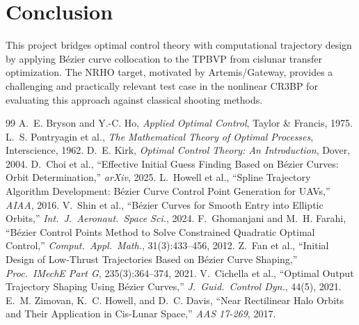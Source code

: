 \documentclass[11pt]{article}
\begin{document}
\section{Conclusion}

This project bridges optimal control theory with computational trajectory design by applying B\'{e}zier curve collocation to the TPBVP from cislunar transfer optimization. The NRHO target, motivated by Artemis/Gateway, provides a challenging and practically relevant test case in the nonlinear CR3BP for evaluating this approach against classical shooting methods.

\begin{thebibliography}{99}
 A.~E. Bryson and Y.-C. Ho, \textit{Applied Optimal Control}, Taylor \& Francis, 1975.
 L.~S. Pontryagin et al., \textit{The Mathematical Theory of Optimal Processes}, Interscience, 1962.
 D.~E. Kirk, \textit{Optimal Control Theory: An Introduction}, Dover, 2004.
 D.~Choi et al., ``Effective Initial Guess Finding Based on B\'{e}zier Curves: Orbit Determination,'' \textit{arXiv}, 2025.
 L.~Howell et al., ``Spline Trajectory Algorithm Development: B\'{e}zier Curve Control Point Generation for UAVs,'' \textit{AIAA}, 2016.
 V.~Shin et al., ``B\'{e}zier Curves for Smooth Entry into Elliptic Orbits,'' \textit{Int.\ J.\ Aeronaut.\ Space Sci.}, 2024.
 F.~Ghomanjani and M.~H. Farahi, ``B\'{e}zier Control Points Method to Solve Constrained Quadratic Optimal Control,'' \textit{Comput.\ Appl.\ Math.}, 31(3):433--456, 2012.
 Z.~Fan et al., ``Initial Design of Low-Thrust Trajectories Based on B\'{e}zier Curve Shaping,'' \textit{Proc.\ IMechE Part G}, 235(3):364--374, 2021.
 V.~Cichella et al., ``Optimal Output Trajectory Shaping Using B\'{e}zier Curves,'' \textit{J.\ Guid.\ Control Dyn.}, 44(5), 2021.
 E.~M. Zimovan, K.~C. Howell, and D.~C. Davis, ``Near Rectilinear Halo Orbits and Their Application in Cis-Lunar Space,'' \textit{AAS 17-269}, 2017.
\end{thebibliography}
\end{document}
